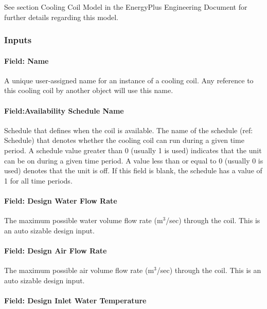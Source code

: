 See section Cooling Coil Model in the EnergyPlus Engineering Document for further details regarding this model.

\subsubsection{Inputs}\label{inputs-022}

\paragraph{Field: Name}\label{field-name-021}

A unique user-assigned name for an instance of a cooling coil. Any reference to this cooling coil by another object will use this name.

\paragraph{Field:Availability Schedule Name}\label{fieldavailability-schedule-name-000}

Schedule that defines when the coil is available. The name of the schedule (ref: Schedule) that denotes whether the cooling coil can run during a given time period. A schedule value greater than 0 (usually 1 is used) indicates that the unit can be on during a given time period. A value less than or equal to 0 (usually 0 is used) denotes that the unit is off. If this field is blank, the schedule has a value of 1 for all time periods.

\paragraph{Field: Design Water Flow Rate}\label{field-design-water-flow-rate-000}

The maximum possible water volume flow rate (m\(^{3}\)/sec) through the coil. This is an auto sizable design input.

\paragraph{Field: Design Air Flow Rate}\label{field-design-air-flow-rate-000}

The maximum possible air volume flow rate (m\(^{3}\)/sec) through the coil. This is an auto sizable design input.

\paragraph{Field: Design Inlet Water Temperature}\label{field-design-inlet-water-temperature-000}

